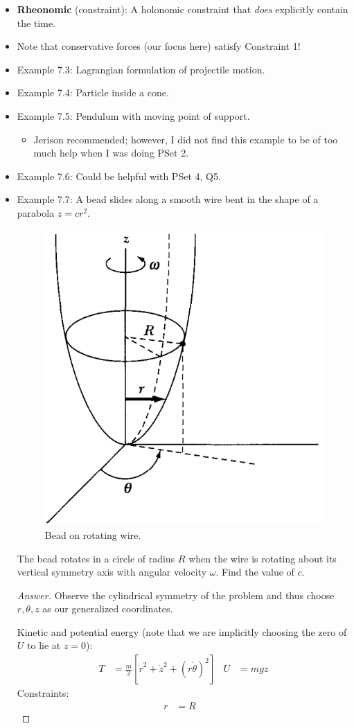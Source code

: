 \documentclass[../notes.tex]{subfiles}
\begin{document}
\begin{itemize}
    \item \textbf{Rheonomic} (constraint): A holonomic constraint that \emph{does} explicitly contain the time.
    \item Note that conservative forces (our focus here) satisfy Constraint 1!
    \item Example 7.3: Lagrangian formulation of projectile motion.
    \item Example 7.4: Particle inside a cone.
    \item Example 7.5: Pendulum with moving point of support.
    \begin{itemize}
        \item Jerison recommended; however, I did not find this example to be of too much help when I was doing PSet 2.
    \end{itemize}
    \item Example 7.6: Could be helpful with PSet 4, Q5.
    \item Example 7.7: A bead slides along a smooth wire bent in the shape of a parabola $z=cr^2$.
    \begin{figure}[H]
        \centering
        \includegraphics[width=0.3\linewidth]{../ExtFiles/ex7-7.png}
        \caption{Bead on rotating wire.}
        \label{fig:ex7-7}
    \end{figure}
    The bead rotates in a circle of radius $R$ when the wire is rotating about its vertical symmetry axis with angular velocity $\omega$. Find the value of $c$.
    \begin{proof}[Answer]
        Observe the cylindrical symmetry of the problem and thus choose $r,\theta,z$ as our generalized coordinates.\par
        Kinetic and potential energy (note that we are implicitly choosing the zero of $U$ to lie at $z=0$):
        \begin{align*}
            T &= \frac{m}{2}[\dot{r}^2+\dot{z}^2+(r\dot{\theta})^2]&
            U &= mgz
        \end{align*}
        Constraints:
        \begin{align*}
            r &= R&

\end{align*}
\end{proof}
\end{itemize}
\end{document}
